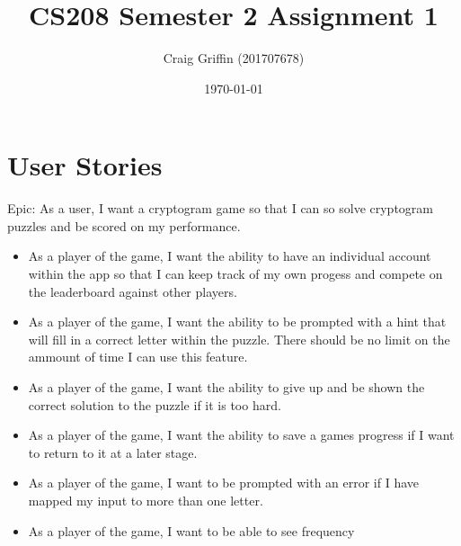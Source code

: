 \documentclass[a4paper,12pt]{article}
\title{CS208 Semester 2 Assignment 1}
\author{Craig Griffin (201707678)}
\date{\today}
\begin{document}
\section{User Stories}
Epic: As a user, I want a cryptogram game so that I can so solve cryptogram puzzles and be scored on my performance.

\begin{itemize}
	

	
  

  \item As a player of the game, I want the ability to have an individual account within the app so that I can keep track of my own progess and compete on the leaderboard against other players.
  \item As a player of the game, I want the ability to be prompted with a hint that will fill in a correct letter within the puzzle. There should be no limit on the ammount of time I can use this feature.
  \item As a player of the game, I want the ability to give up and be shown the correct solution to the puzzle if it is too hard. 
  \item As a player of the game, I want the ability to save a games progress if I want to return to it at a later stage. 
  \item As a player of the game, I want to be prompted with an error if I have mapped my input to more than one letter.
  \item As a player of the game, I want to be able to see frequency 

\end{itemize}
\end{document}
